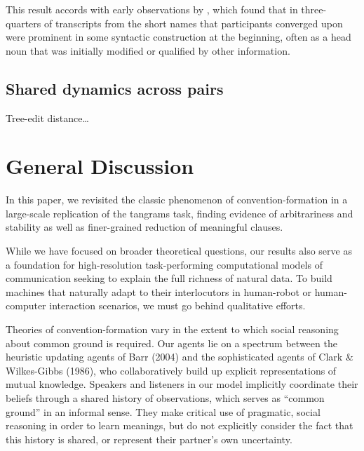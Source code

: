 \documentclass[alpha-refs]{wiley-article}
\begin{document}
This result accords with early observations by \cite{Carroll80_NamingHedges}, which found that in three-quarters of transcripts from \cite{KraussWeinheimer64_ReferencePhrases} the short names that participants converged upon were prominent in some syntactic construction at the beginning, often as a head noun that was initially modified or qualified by other information. 

\subsection{Shared dynamics across pairs}

Tree-edit distance\dots


\section{General Discussion}\label{general-discussion}

In this paper, we revisited the classic phenomenon of
convention-formation in a large-scale replication of the tangrams task,
finding evidence of arbitrariness and stability as well as finer-grained
reduction of meaningful clauses. 

While we have focused on broader theoretical questions, our results also serve as a foundation for high-resolution task-performing computational models of communication seeking to explain the full richness of natural data. To build machines that naturally adapt to their interlocutors in human-robot or human-computer interaction scenarios, we must go behind qualitative efforts.

Theories of convention-formation vary in the extent to which social
reasoning about common ground is required. Our agents lie on a spectrum
between the heuristic updating agents of Barr (2004) and the
sophisticated agents of Clark \& Wilkes-Gibbs (1986), who
collaboratively build up explicit representations of mutual knowledge.
Speakers and listeners in our model implicitly coordinate their beliefs
through a shared history of observations, which serves as ``common
ground'' in an informal sense. They make critical use of pragmatic,
social reasoning in order to learn meanings, but do not explicitly
consider the fact that this history is shared, or represent their
partner's own uncertainty.
\end{document}
